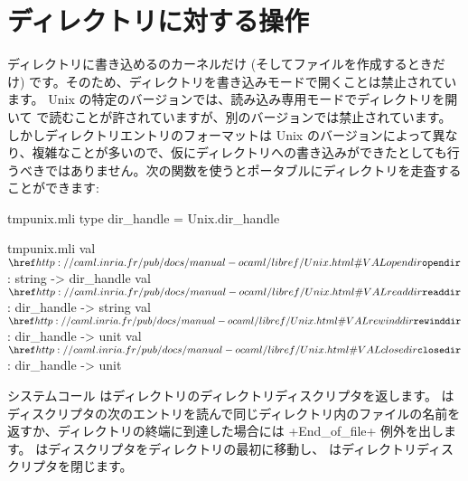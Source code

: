 \section{ディレクトリに対する操作}

ディレクトリに書き込めるのカーネルだけ (そしてファイルを作成するときだけ) です。そのため、ディレクトリを書き込みモードで開くことは禁止されています。 Unix の特定のバージョンでは、読み込み専用モードでディレクトリを開いて で読むことが許されていますが、別のバージョンでは禁止されています。しかしディレクトリエントリのフォーマットは Unix のバージョンによって異なり、複雑なことが多いので、仮にディレクトリへの書き込みができたとしても行うべきではありません。次の関数を使うとポータブルにディレクトリを走査することができます:
%
\begin{codefile}{tmpunix.mli}
type dir_handle = Unix.dir_handle
\end{codefile}
%
\begin{listingcodefile}{tmpunix.mli}
val $\libvalue{Unix}{opendir}$   : string -> dir_handle
val $\libvalue{Unix}{readdir}$   : dir_handle -> string
val $\libvalue{Unix}{rewinddir}$ : dir_handle -> unit
val $\libvalue{Unix}{closedir}$  : dir_handle -> unit
\end{listingcodefile}
%
システムコール  はディレクトリのディレクトリディスクリプタを返します。  はディスクリプタの次のエントリを読んで同じディレクトリ内のファイルの名前を返すか、ディレクトリの終端に到達した場合には \ml+End_of_file+ 例外を出します。 はディスクリプタをディレクトリの最初に移動し、 はディレクトリディスクリプタを閉じます。
